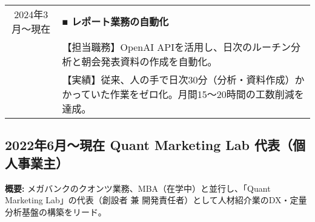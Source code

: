 \documentclass[uplatex,a4j,10.5pt,dvipdfmx]{jsarticle}
\begin{document}
\begin{longtable}{|c|p{14cm}|}
	\hline
	2024年3月～現在                        & \textbf{■ レポート業務の自動化}                                                                                        \\
	                                  & 【担当職務】OpenAI APIを活用し、日次のルーチン分析と朝会発表資料の作成を自動化。                                                            \\
	                                  & 【実績】従来、人の手で日次30分（分析・資料作成）かかっていた作業をゼロ化。月間15～20時間の工数削減を達成。                                                     \\
	\hline
\end{longtable}



\subsection{2022年6月～現在 Quant Marketing Lab 代表（個人事業主）}
\noindent\textbf{概要:} メガバンクのクオンツ業務、MBA（在学中）と並行し、「Quant Marketing Lab」の代表（創設者 兼 開発責任者）として人材紹介業のDX・定量分析基盤の構築をリード。
\end{document}
